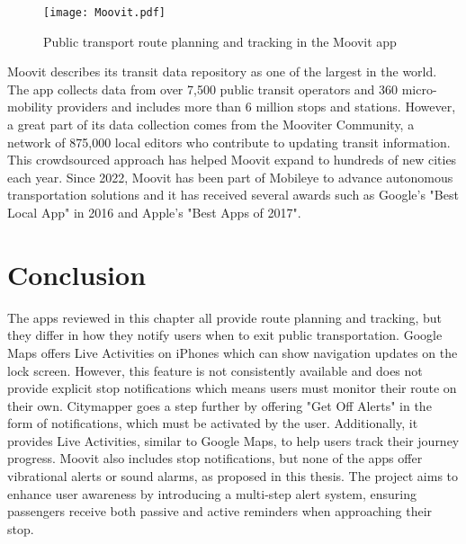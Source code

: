 \begin{figure}[htbp]
    \centering
    \texttt{[image: Moovit.pdf]}
    \caption{Public transport route planning and tracking in the Moovit app}
    \label{fig:Moovit}
\end{figure}

Moovit \cite{moovit_about} describes its transit data repository as one of the largest in the world. 
The app collects data from over 7,500 public transit operators and 360 micro-mobility providers and includes more than 6 million stops and stations.
However, a great part of its data collection comes from the Mooviter Community, a network of 875,000 local editors who contribute to updating transit information. 
This crowdsourced approach has helped Moovit expand to hundreds of new cities each year.
Since 2022, Moovit has been part of Mobileye to advance autonomous transportation solutions and it has received several awards such as Google's "Best Local App" in 2016 and Apple's "Best Apps of 2017".

\section{Conclusion}
The apps reviewed in this chapter all provide route planning and tracking, but they differ in how they notify users when to exit public transportation.
Google Maps offers Live Activities on iPhones which can show navigation updates on the lock screen. 
However, this feature is not consistently available and does not provide explicit stop notifications which means users must monitor their route on their own.
Citymapper goes a step further by offering "Get Off Alerts" in the form of notifications, which must be activated by the user.
Additionally, it provides Live Activities, similar to Google Maps, to help users track their journey progress.
Moovit also includes stop notifications, but none of the apps offer vibrational alerts or sound alarms, as proposed in this thesis.
The project aims to enhance user awareness by introducing a multi-step alert system, ensuring passengers receive both passive and active reminders when approaching their stop.
